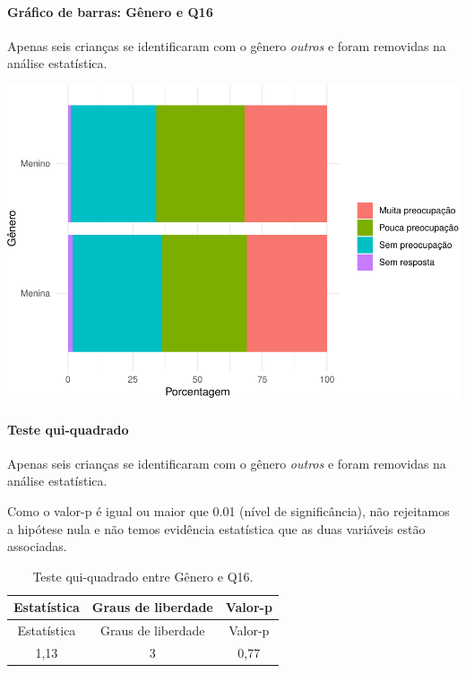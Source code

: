 \documentclass[]{article}
\let\oldparagraph\paragraph
\renewcommand{\paragraph}[1]{\oldparagraph{#1}\mbox{}}
\begin{document}
\hypertarget{gruxe1fico-de-barras-guxeanero-e-q16}{%
\paragraph{Gráfico de barras: Gênero e Q16}\label{gruxe1fico-de-barras-guxeanero-e-q16}}

Apenas seis crianças se identificaram com o gênero \emph{outros} e foram removidas na análise estatística.

\begin{center}\includegraphics[width=0.75\linewidth]{relatorio_covid19_files/figure-latex/unnamed-chunk-141-1} \end{center}

\hypertarget{teste-qui-quadrado-13}{%
\paragraph{Teste qui-quadrado}\label{teste-qui-quadrado-13}}

Apenas seis crianças se identificaram com o gênero \emph{outros} e foram removidas na análise estatística.

Como o valor-p é igual ou maior que 0.01 (nível de significância), não rejeitamos a hipótese nula e não temos evidência estatística que as duas variáveis estão associadas.

\begin{longtable}[]{@{}ccc@{}}
\caption{\label{tab:unnamed-chunk-143}Teste qui-quadrado entre Gênero e Q16.}\tabularnewline
\toprule
Estatística & Graus de liberdade & Valor-p\tabularnewline
\midrule
\endfirsthead
\toprule
Estatística & Graus de liberdade & Valor-p\tabularnewline
\midrule
\endhead
1,13 & 3 & 0,77\tabularnewline
\bottomrule
\end{longtable}

\cleardoublepage
\end{document}
